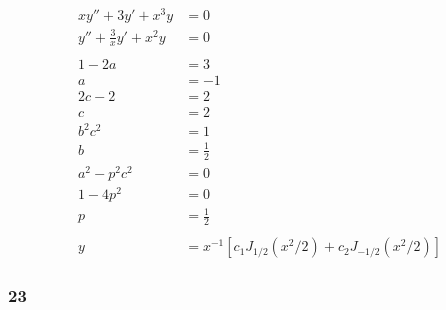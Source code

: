\documentclass{article}
\begin{document}
\begin{align*}
  x y'' + 3 y' + x^3 y         & = 0                                                         \\
  y'' + \frac{3}{x} y' + x^2 y & = 0                                                         \\ \\
  1 - 2 a                      & = 3                                                         \\
  a                            & = -1                                                        \\
  2 c - 2                      & = 2                                                         \\
  c                            & = 2                                                         \\
  b^2 c^2                      & = 1                                                         \\
  b                            & = \frac{1}{2}                                               \\
  a^2 - p^2 c^2                & = 0                                                         \\
  1 - 4 p^2                    & = 0                                                         \\
  p                            & = \frac{1}{2}                                               \\ \\
  y                            & = x^{-1} [c_1 J_{1 / 2}(x^2 / 2) + c_2 J_{-1 / 2}(x^2 / 2)]
\end{align*}

\subsubsection{23}
\end{document}
